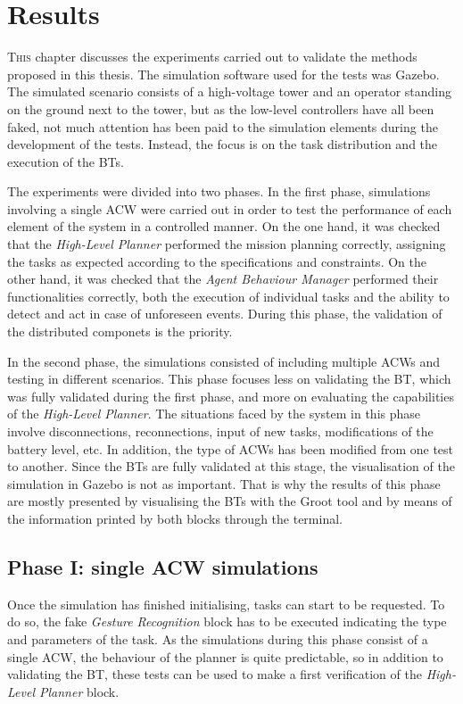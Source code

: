 \chapter{Results}
\label{ch:Results}
\lettrine[lraise=-0.1, lines=2, loversize=0.2]{T}{his} chapter discusses the experiments carried out to validate the methods proposed in this thesis. The simulation software used for the tests was Gazebo. The simulated scenario consists of a high-voltage tower and an operator standing on the ground next to the tower, but as the low-level controllers have all been faked, not much attention has been paid to the simulation elements during the development of the tests. Instead, the focus is on the task distribution and the execution of the \glspl{BT}.

The experiments were divided into two phases. In the first phase, simulations involving a single \gls{ACW} were carried out in order to test the performance of each element of the system in a controlled manner. On the one hand, it was checked that the \emph{High-Level Planner} performed the mission planning correctly, assigning the tasks as expected according to the specifications and constraints. On the other hand, it was checked that the \emph{Agent Behaviour Manager} performed their functionalities correctly, both the execution of individual tasks and the ability to detect and act in case of unforeseen events. During this phase, the validation of the distributed componets is the priority.

In the second phase, the simulations consisted of including multiple \glspl{ACW} and testing in different scenarios. This phase focuses less on validating the \gls{BT}, which was fully validated during the first phase, and more on evaluating the capabilities of the \emph{High-Level Planner}. The situations faced by the system in this phase involve disconnections, reconnections, input of new tasks, modifications of the battery level, etc. In addition, the type of \glspl{ACW} has been modified from one test to another. Since the \glspl{BT} are fully validated at this stage, the visualisation of the simulation in Gazebo is not as important. That is why the results of this phase are mostly presented by visualising the \glspl{BT} with the Groot tool and by means of the information printed by both blocks through the terminal. 

\section{Phase I: single ACW simulations}
\label{sec:phaseI}
Once the simulation has finished initialising, tasks can start to be requested. To do so, the fake \emph{Gesture Recognition} block has to be executed indicating the type and parameters of the task. As the simulations during this phase consist of a single \gls{ACW}, the behaviour of the planner is quite predictable, so in addition to validating the \gls{BT}, these tests can be used to make a first verification of the \emph{High-Level Planner} block.

